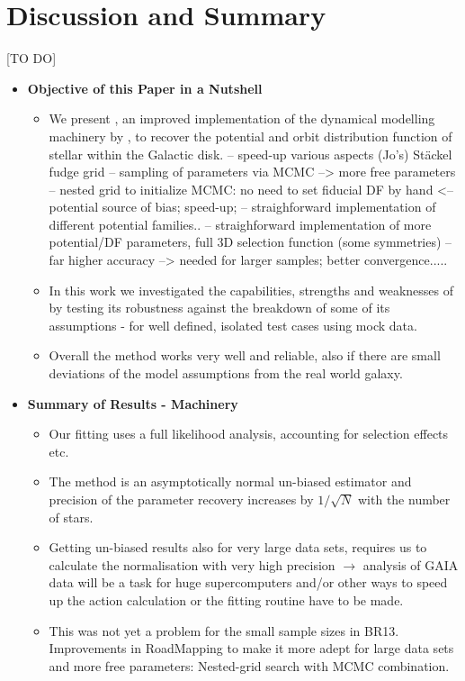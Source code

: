 \section{Discussion and Summary}

[TO DO]

\begin{itemize}

\item \textbf{Objective of this Paper in a Nutshell}
\begin{itemize}
\item We present \RM, an improved implementation of the dynamical modelling machinery by \citet{bov13}, to recover the potential and orbit distribution function of stellar \MAPs within the Galactic disk.
--  speed-up various aspects
   (Jo's) Stäckel fudge grid
--  sampling of parameters via MCMC  --> more free parameters
--  nested grid to initialize MCMC: no need to set fiducial DF by hand <-- potential source of bias; speed-up; 
-- straighforward implementation of different potential families..
-- straighforward implementation of more potential/DF parameters, full 3D selection function (some symmetries) 
-- far higher accuracy --> needed for larger samples; better convergence.....

\item In this work we investigated the capabilities, strengths and weaknesses of \RM by testing its robustness against the breakdown of some of its assumptions - for well defined, isolated test cases using mock data.
\item Overall the method works very well and reliable, also if there are small deviations of the model assumptions from the real world galaxy.
\end{itemize}

\item \textbf{Summary of Results - Machinery}

\begin{itemize}
\item Our fitting uses a full likelihood analysis, accounting for selection effects etc.
\item The method is an asymptotically normal un-biased estimator and precision of the parameter recovery increases by $1/\sqrt{N}$ with the number of stars.
\item Getting un-biased results also for very large data sets, requires us to calculate the normalisation with very high precision $\longrightarrow$ analysis of GAIA data will be a task for huge supercomputers and/or other ways to speed up the action calculation or the fitting routine have to be made.
\item This was not yet a problem for the small sample sizes in BR13. Improvements in RoadMapping to make it more adept for large data sets and more free parameters: Nested-grid search with MCMC combination.
\end{itemize}


\end{itemize}
